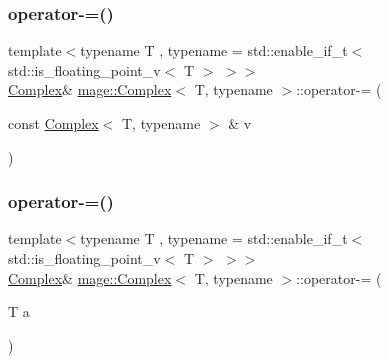 \subsubsection{\texorpdfstring{operator-\/=()}{operator-=()}\hspace{0.1cm}{\footnotesize\ttfamily [1/2]}}
{\footnotesize\ttfamily template$<$typename T , typename  = std\+::enable\+\_\+if\+\_\+t$<$ std\+::is\+\_\+floating\+\_\+point\+\_\+v$<$ T $>$ $>$$>$ \\
\mbox{\hyperlink{structmage_1_1_complex}{Complex}}\& \mbox{\hyperlink{structmage_1_1_complex}{mage\+::\+Complex}}$<$ T, typename $>$\+::operator-\/= (\begin{DoxyParamCaption}\item[{const \mbox{\hyperlink{structmage_1_1_complex}{Complex}}$<$ T, typename $>$ \&}]{v }\end{DoxyParamCaption})\hspace{0.3cm}{\ttfamily [noexcept]}}

\mbox{\label{structmage_1_1_complex_ab95cb500cec9257a7e45a101c4c4269e}} 
\subsubsection{\texorpdfstring{operator-\/=()}{operator-=()}\hspace{0.1cm}{\footnotesize\ttfamily [2/2]}}
{\footnotesize\ttfamily template$<$typename T , typename  = std\+::enable\+\_\+if\+\_\+t$<$ std\+::is\+\_\+floating\+\_\+point\+\_\+v$<$ T $>$ $>$$>$ \\
\mbox{\hyperlink{structmage_1_1_complex}{Complex}}\& \mbox{\hyperlink{structmage_1_1_complex}{mage\+::\+Complex}}$<$ T, typename $>$\+::operator-\/= (\begin{DoxyParamCaption}\item[{T}]{a }\end{DoxyParamCaption})\hspace{0.3cm}{\ttfamily [noexcept]}}

\mbox{\label{structmage_1_1_complex_a097109a637f77e6eeae0e6e22002578c}} 
